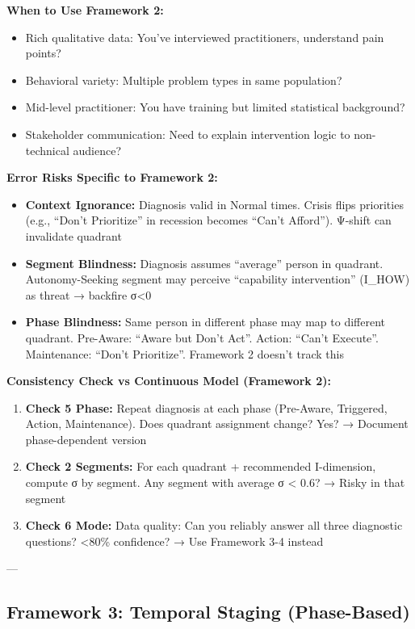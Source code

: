 \textbf{When to Use Framework 2:}
\begin{itemize}[nosep]
\item Rich qualitative data: You've interviewed practitioners, understand pain points?
\item Behavioral variety: Multiple problem types in same population?
\item Mid-level practitioner: You have training but limited statistical background?
\item Stakeholder communication: Need to explain intervention logic to non-technical audience?
\end{itemize}

\textbf{Error Risks Specific to Framework 2:}
\begin{itemize}[nosep]
\item \textbf{Context Ignorance:} Diagnosis valid in Normal times. Crisis flips priorities (e.g., ``Don't Prioritize'' in recession becomes ``Can't Afford''). Ψ-shift can invalidate quadrant
\item \textbf{Segment Blindness:} Diagnosis assumes ``average'' person in quadrant. Autonomy-Seeking segment may perceive ``capability intervention'' (I\_HOW) as threat → backfire σ<0
\item \textbf{Phase Blindness:} Same person in different phase may map to different quadrant. Pre-Aware: ``Aware but Don't Act''. Action: ``Can't Execute''. Maintenance: ``Don't Prioritize''. Framework 2 doesn't track this
\end{itemize}

\textbf{Consistency Check vs Continuous Model (Framework 2):}
\begin{enumerate}[nosep]
\item \textbf{Check 5 Phase:} Repeat diagnosis at each phase (Pre-Aware, Triggered, Action, Maintenance). Does quadrant assignment change? Yes? → Document phase-dependent version
\item \textbf{Check 2 Segments:} For each quadrant + recommended I-dimension, compute σ by segment. Any segment with average σ < 0.6? → Risky in that segment
\item \textbf{Check 6 Mode:} Data quality: Can you reliably answer all three diagnostic questions? <80\% confidence? → Use Framework 3-4 instead
\end{enumerate}

---

\subsection{Framework 3: Temporal Staging (Phase-Based)}
\label{subsec:20-framework-3}


